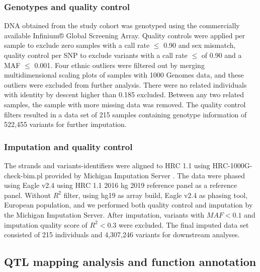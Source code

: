 \documentclass{book}
\begin{document}
\begin{refsection}
\subsubsection*{Genotypes and quality control}
DNA obtained from the study cohort was genotyped using the commercially available Infinium® Global Screening Array.
Quality controls were applied per sample to exclude zero samples with a call rate $\leq$ 0.90 and sex mismatch, quality control per SNP to exclude variants with a call rate $\leq$ of 0.90 and a MAF $\leq$ 0.001.
Four ethnic outliers were filtered out by merging multidimensional scaling plots of samples with 1000 Genomes data, and these outliers were excluded from further analysis.
There were no related individuals with identity by descent higher than 0.185 excluded.
Between any two related samples, the sample with more missing data was removed.
The quality control filters resulted in a data set of 215 samples containing genotype information of 522,455 variants for further imputation.

\subsubsection*{Imputation and quality control}
The strands and variants-identifiers were aligned to HRC 1.1 using HRC-1000G-check-bim.pl provided by Michigan Imputation Server \cite{Das2016Next}.
The data were phased using Eagle v2.4 using HRC 1.1 2016 hg 2019 reference panel as a reference panel.
Without $R^2$ filter, using hg19 as array build, Eagle v2.4 as phasing tool, European population, and we performed both quality control and imputation by the Michigan Imputation Server.
After imputation, variants with $MAF < 0.1$ and imputation quality score of $R^2 < 0.3$ were excluded.
The final imputed data set consisted of 215 individuals and 4,307,246 variants for downstream analyses.

\subsection*{QTL mapping analysis and function annotation}


\end{refsection}
\end{document}
